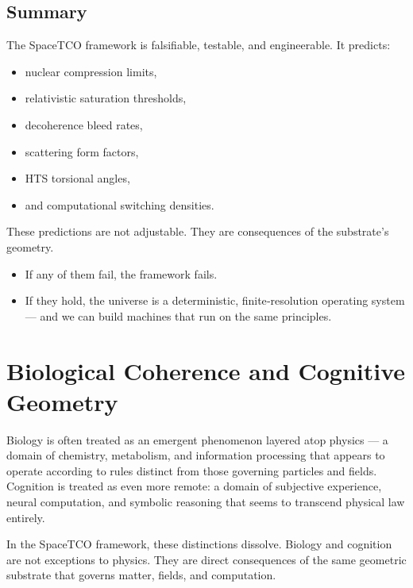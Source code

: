 \documentclass[reprint,amsmath,amssymb,aps,prl,floatfix]{revtex4-2}
\begin{document}
\begin{itemize}
\subsection{Summary}

The SpaceTCO framework is falsifiable, testable, and engineerable. It predicts:
\begin{itemize}
\item nuclear compression limits,  
\item relativistic saturation thresholds,  
\item decoherence bleed rates,  
\item scattering form factors,  
\item HTS torsional angles,  
\item and computational switching densities.
\end{itemize}
\medskip

These predictions are not adjustable.  
They are consequences of the substrate’s geometry.
\medskip

\begin{itemize}
\item If any of them fail, the framework fails.
\item If they hold, the universe is a deterministic, finite‑resolution operating system — and we can build machines that run on the same principles.
\end{itemize}

\section{Biological Coherence and Cognitive Geometry}

Biology is often treated as an emergent phenomenon layered atop physics — a domain of chemistry, metabolism, and information processing that appears to operate according to rules distinct from those governing particles and fields. Cognition is treated as even more remote: a domain of subjective experience, neural computation, and symbolic reasoning that seems to transcend physical law entirely.
\medskip

In the SpaceTCO framework, these distinctions dissolve.  
Biology and cognition are not exceptions to physics.  
They are direct consequences of the same geometric substrate that governs matter, fields, and computation.
\medskip


\end{itemize}
\end{document}
